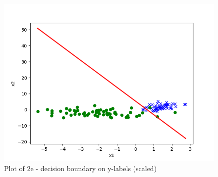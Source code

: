 \begin{answer}
\begin{figure}
  \includegraphics[width=\linewidth]{../src/output/p02e_pred_test.png}
  \caption{Plot of 2e - decision boundary on y-labels (scaled)}
  \label{fig:Plot of 2e - decision boundary on y-labels (scaled)}
\end{figure}\\
\end{answer}
